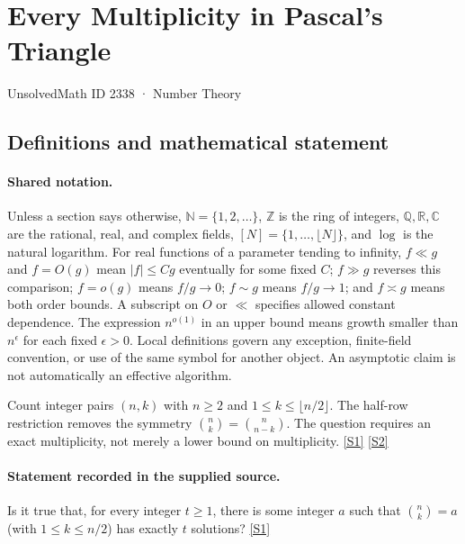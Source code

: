 \documentclass[11pt,a4paper]{article}
\newcommand{\N}{\mathbb{N}}
\newcommand{\Z}{\mathbb{Z}}
\newcommand{\Q}{\mathbb{Q}}
\newcommand{\R}{\mathbb{R}}
\newcommand{\C}{\mathbb{C}}
\newcommand{\sref}[2]{\hyperlink{source:#1:#2}{[S#2]}}
\begin{document}

\setcounter{section}{2337}

\section{Every Multiplicity in Pascal's Triangle}\label{2338}

{\small\sffamily UnsolvedMath ID 2338 · Number Theory}

\subsection{Definitions and mathematical statement}

\paragraph{Shared notation.}Unless a section says otherwise, $\N=\{1,2,\ldots\}$,
$\Z$ is the ring of integers, $\Q,\R,\C$ are the rational, real, and complex
fields, $[N]=\{1,\ldots,\lfloor N\rfloor\}$, and $\log$ is the natural
logarithm. For real functions of a parameter tending to infinity,
$f\ll g$ and $f=O(g)$ mean $|f|\leq Cg$ eventually for some fixed $C$;
$f\gg g$ reverses this comparison; $f=o(g)$ means $f/g\to0$;
$f\sim g$ means $f/g\to1$; and $f\asymp g$ means both order bounds.
A subscript on $O$ or $\ll$ specifies allowed constant dependence.
The expression $n^{o(1)}$ in an upper bound means growth smaller than
$n^\epsilon$ for each fixed $\epsilon>0$. Local definitions govern any
exception, finite-field convention, or use of the same symbol for another
object. An asymptotic claim is not automatically an effective algorithm.



Count integer pairs $(n,k)$ with $n\geq2$ and $1\leq k\leq\lfloor n/2\rfloor$. The half-row restriction removes the symmetry $\binom nk=\binom n{n-k}$. The question requires an exact multiplicity, not merely a lower bound on multiplicity. \sref{2338}{1} \sref{2338}{2}

\paragraph{Statement recorded in the supplied source.}
Is it true that, for every integer $t\geq 1$, there is some integer $a$ such that $ \binom{n}{k}=a $ (with $1\leq k\leq n/2$) has exactly $t$ solutions? \sref{2338}{1}
\end{document}
